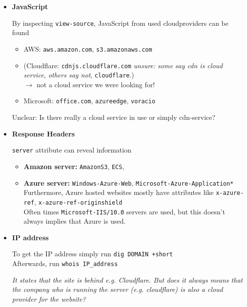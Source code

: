 \documentclass[12pt]{article}
\begin{document}
\begin{itemize}
    \item \textbf{JavaScript}

    By inspecting \verb|view-source|, JavaScript from used cloudproviders can be found
    \begin{itemize}
        \item AWS: \verb|aws.amazon.com|, \verb|s3.amazonaws.com| %
        \item (Cloudflare:
        \verb|cdnjs.cloudflare.com| \textit{unsure: some say cdn is cloud service, others say not}, \verb|cloudflare|.) \\
        $\rightarrow$ not a cloud service we were looking for!
        \item Microsoft: \verb|office.com|, \verb|azureedge|, \verb|voracio|
    \end{itemize}
    
    Unclear: Is there really a cloud service in use or simply cdn-service? 
    
    
    \item \textbf{Response Headers}
    
    \verb|server| attribute can reveal information 
    \begin{itemize}
        \item \textbf{Amazon server:} \verb|AmazonS3|, \verb|ECS|, 
        \item \textbf{Azure server:} \verb|Windows-Azure-Web|, \verb|Microsoft-Azure-Application*| \\
        Furthermore, Azure hosted websites mostly have attributes like \verb|x-azure-ref|, \verb|x-azure-ref-originshield| \\
        Often times \verb|Microsoft-IIS/10.0| servers are used, but this doesn't always implies  that Azure is used.
    \end{itemize}
    
    
    \item \textbf{IP address}
    
    To get the IP address simply run \verb|dig DOMAIN +short| \\
    Afterwards, run \verb|whois IP_address| 
    
    \textit{It states that the site is behind e.g. Cloudflare. But does it always means that the company who is running the server (e.g. cloudflare) is also a cloud provider for the website?}
    
 
\end{itemize}
\end{document}
